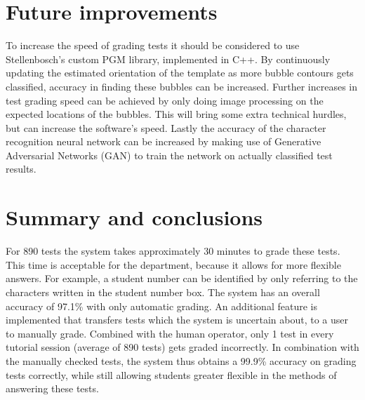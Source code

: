 \section{Future improvements}
To increase the speed of grading tests it should be considered to use Stellenbosch's custom PGM library, implemented in C++. By continuously updating the estimated orientation of the template as more bubble contours gets classified, accuracy in finding these bubbles can be increased. Further increases in test grading speed can be achieved by only doing image processing on the expected locations of the bubbles. This will bring some extra technical hurdles, but can increase the software's speed. Lastly the accuracy of the character recognition neural network can be increased by making use of Generative Adversarial Networks (GAN) to train the network on actually classified test results.

\section{Summary and conclusions}
For 890 tests the system takes approximately 30 minutes to grade these tests. This time is acceptable for the department, because it allows for more flexible answers. For example, a student number can be identified by only referring to the characters written in the student number box. The system has an overall accuracy of 97.1\% with only automatic grading. An additional feature is implemented that transfers tests which the system is uncertain about, to a user to manually grade. Combined with the human operator, only 1 test in every tutorial session (average of 890 tests) gets graded incorrectly. In combination with the manually checked tests, the system thus obtains a 99.9\% accuracy on grading tests correctly, while still allowing students greater flexible in the methods of answering these tests.